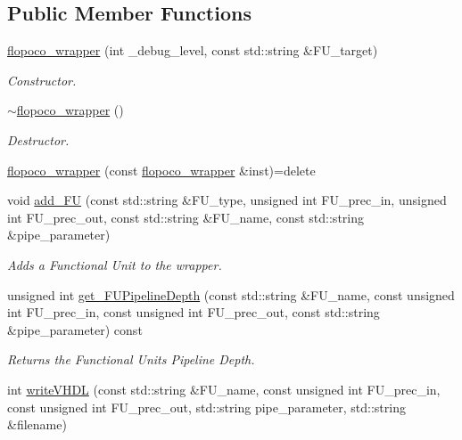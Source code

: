 \subsection*{Public Member Functions}
\begin{DoxyCompactItemize}
\item 
\hyperlink{classflopoco__wrapper_a96975b686fca80c7a78c8e3a3fde4ddc}{flopoco\+\_\+wrapper} (int \+\_\+debug\+\_\+level, const std\+::string \&F\+U\+\_\+target)
\begin{DoxyCompactList}\small\item\em Constructor. \end{DoxyCompactList}\item 
\hyperlink{classflopoco__wrapper_a0231fbfc514e9b11f4f2dfddc6d6240c}{$\sim$flopoco\+\_\+wrapper} ()
\begin{DoxyCompactList}\small\item\em Destructor. \end{DoxyCompactList}\item 
\hyperlink{classflopoco__wrapper_ad3cabcc4456dfdc78938fe6c8e83d1db}{flopoco\+\_\+wrapper} (const \hyperlink{classflopoco__wrapper}{flopoco\+\_\+wrapper} \&inst)=delete
\item 
void \hyperlink{classflopoco__wrapper_a1bf6c7e46b20a7db7a71f46f8483637e}{add\+\_\+\+FU} (const std\+::string \&F\+U\+\_\+type, unsigned int F\+U\+\_\+prec\+\_\+in, unsigned int F\+U\+\_\+prec\+\_\+out, const std\+::string \&F\+U\+\_\+name, const std\+::string \&pipe\+\_\+parameter)
\begin{DoxyCompactList}\small\item\em Adds a Functional Unit to the wrapper. \end{DoxyCompactList}\item 
unsigned int \hyperlink{classflopoco__wrapper_a0d439a47ce9842523b91cd5763bd5fe1}{get\+\_\+\+F\+U\+Pipeline\+Depth} (const std\+::string \&F\+U\+\_\+name, const unsigned int F\+U\+\_\+prec\+\_\+in, const unsigned int F\+U\+\_\+prec\+\_\+out, const std\+::string \&pipe\+\_\+parameter) const
\begin{DoxyCompactList}\small\item\em Returns the Functional Unit\textquotesingle{}s Pipeline Depth. \end{DoxyCompactList}\item 
int \hyperlink{classflopoco__wrapper_ac9b07db0e6bdc7bb6a7477fe26aba92f}{write\+V\+H\+DL} (const std\+::string \&F\+U\+\_\+name, const unsigned int F\+U\+\_\+prec\+\_\+in, const unsigned int F\+U\+\_\+prec\+\_\+out, std\+::string pipe\+\_\+parameter, std\+::string \&filename)

\end{DoxyCompactItemize}
